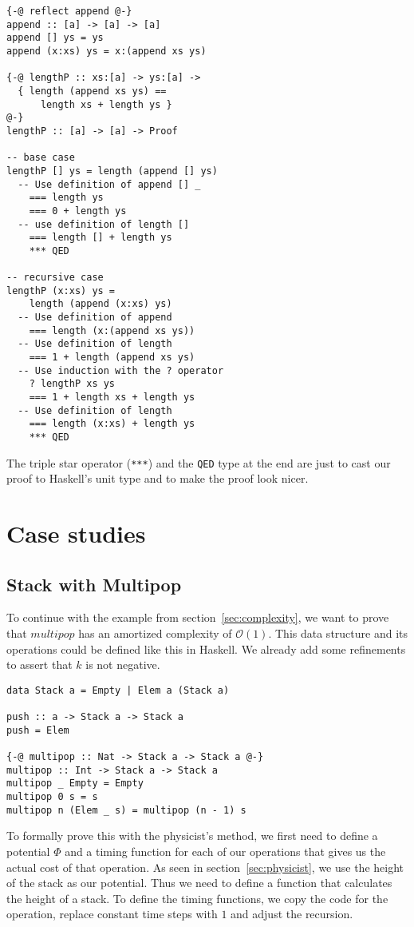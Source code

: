 \documentclass[sigplan,screen]{acmart}
\renewcommand\O[1]{$\mathcal{O}(#1)$}
\begin{document}
\begin{lstlisting}
{-@ reflect append @-}
append :: [a] -> [a] -> [a]
append [] ys = ys
append (x:xs) ys = x:(append xs ys)

{-@ lengthP :: xs:[a] -> ys:[a] ->
  { length (append xs ys) ==
      length xs + length ys }
@-}
lengthP :: [a] -> [a] -> Proof

-- base case
lengthP [] ys = length (append [] ys)
  -- Use definition of append [] _
    === length ys
    === 0 + length ys
  -- use definition of length []
    === length [] + length ys
    *** QED

-- recursive case
lengthP (x:xs) ys =
    length (append (x:xs) ys)
  -- Use definition of append
    === length (x:(append xs ys))
  -- Use definition of length
    === 1 + length (append xs ys)
  -- Use induction with the ? operator
    ? lengthP xs ys
    === 1 + length xs + length ys
  -- Use definition of length
    === length (x:xs) + length ys
    *** QED
\end{lstlisting}

The triple star operator (\texttt{***}) and the \texttt{QED} type at the end are just to cast our proof to Haskell's unit type and to make the proof look nicer.

\section{Case studies}

\subsection{Stack with Multipop}\label{sec:stack}

To continue with the example from section~\ref{sec:complexity}, we want to prove that $multipop$ has an amortized complexity of \O{1}. This data structure and its operations could be defined like this in Haskell. We already add some refinements to assert that $k$ is not negative.

\begin{lstlisting}
data Stack a = Empty | Elem a (Stack a)

push :: a -> Stack a -> Stack a
push = Elem

{-@ multipop :: Nat -> Stack a -> Stack a @-}
multipop :: Int -> Stack a -> Stack a
multipop _ Empty = Empty
multipop 0 s = s
multipop n (Elem _ s) = multipop (n - 1) s
\end{lstlisting}

To formally prove this with the physicist's method, we first need to define a potential $\Phi$ and a timing function for each of our operations that gives us the actual cost of that operation. As seen in section~\ref{sec:physicist}, we use the height of the stack as our potential. Thus we need to define a function that calculates the height of a stack. To define the timing functions, we copy the code for the operation, replace constant time steps with $1$ and adjust the recursion.
\end{document}

